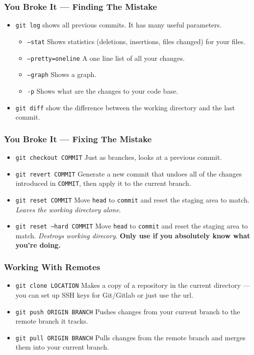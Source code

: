 \documentclass{beamer}
\newcommand{\shellcmd}[1]{\texttt{\colorbox{gray!30}{#1}}}
\newcommand{\hugeslide}[1]{
\begin{frame}[plain,c]
    \centering {\usebeamerfont*{frametitle} \usebeamercolor[fg]{frametitle}\fontsize{40}{50}\selectfont \textit{#1}}
\end{frame}
}
\begin{document}
\hugeslide{Demo}

\begin{frame}
    \frametitle{You Broke It --- Finding The Mistake}

    \begin{itemize}
        \item \shellcmd{git log} shows all previous commits. It has many useful parameters.
        \begin{itemize}
            \item \shellcmd{--stat} Shows statistics (deletions, insertions, files changed) for your files.
            \item \shellcmd{--pretty=oneline} A one line list of all your changes.
            \item \shellcmd{--graph} Shows a graph.
            \item \shellcmd{-p} Shows what are the changes to your code base.
        \end{itemize}

        \item \shellcmd{git diff} show the difference between the working directory and the last commit.
    \end{itemize}
\end{frame}

\begin{frame}
    \frametitle{You Broke It --- Fixing The Mistake}

    \begin{itemize}
        \item \shellcmd{git checkout COMMIT} Just as branches, looks at a previous commit.
        \item \shellcmd{git revert COMMIT} Generate a new commit that undoes all of the changes introduced in \shellcmd{COMMIT}, then apply it to the current branch.
        \item \shellcmd{git reset COMMIT} Move \shellcmd{head} to \shellcmd{commit} and reset the staging area to match. \textit{Leaves the working directory alone}.
        \item  \shellcmd{git reset --hard COMMIT} Move \shellcmd{head} to \shellcmd{commit} and reset the staging area to match. \textit{Destroys working direcory}. \textbf{Only use if you absolutely know what you're doing.}
    \end{itemize}
\end{frame}

\begin{frame}
    \frametitle{Working With Remotes}

    \begin{itemize}
		\item \shellcmd{git clone LOCATION} Makes a copy of a repository in the current directory --- you can set up SSH keys for Git/Gitlab or just use the url.
		\item \shellcmd{git push ORIGIN BRANCH} Pushes changes from your current branch to the remote branch it tracks.
		\item \shellcmd{git pull ORIGIN BRANCH} Pulls changes from the remote branch and merges them into your current branch.
	\end{itemize}
\end{frame}
\end{document}
